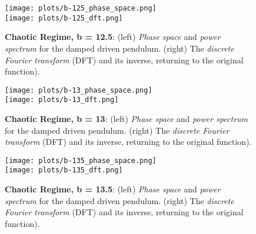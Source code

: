 \documentclass[10pt]{article}
\begin{document}
\begin{figure} [ht]
\begin{center}
\texttt{[image: plots/b-125\_phase\_space.png]} \\
\texttt{[image: plots/b-125\_dft.png]} 
\caption{{\bf Chaotic Regime, b = 12.5}: (left) {\it Phase space} and {\it power spectrum} for the damped driven  pendulum. (right) The {\it discrete Fourier transform} (DFT) and its inverse, returning to the original function).}
\end{center}
\end{figure}


\begin{figure} [ht]
\begin{center}
\texttt{[image: plots/b-13\_phase\_space.png]} \\
\texttt{[image: plots/b-13\_dft.png]} 
\caption{{\bf Chaotic Regime, b = 13}: (left) {\it Phase space} and {\it power spectrum} for the damped driven  pendulum. (right) The {\it discrete Fourier transform} (DFT) and its inverse, returning to the original function).}
\end{center}
\end{figure}

\begin{figure} [ht]
\begin{center}
\texttt{[image: plots/b-135\_phase\_space.png]} \\
\texttt{[image: plots/b-135\_dft.png]} 
\caption{{\bf Chaotic Regime, b = 13.5}: (left) {\it Phase space} and {\it power spectrum} for the damped driven  pendulum. (right) The {\it discrete Fourier transform} (DFT) and its inverse, returning to the original function).}
\end{center}
\end{figure}

\quad



\end{document}
